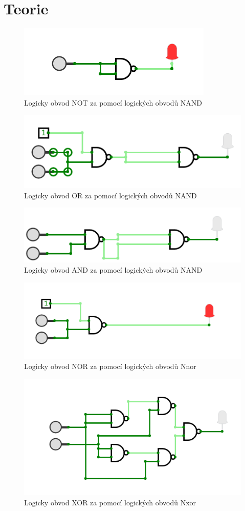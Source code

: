 \documentclass[a4paper]{article}
\begin{document}
\section*{Teorie}
\begin{figure}[h!]
	\renewcommand\figurename{Obvod}
	\centering
	\includegraphics[width=0.6\linewidth]{not.png}
	\caption{Logicky obvod  NOT za pomocí logických obvodů NAND}
	\label{fig:not}
\end{figure}
\begin{figure}[h!]
	\renewcommand\figurename{Obvod}
	\centering
	\includegraphics[width=0.6\linewidth]{or.png}
	\caption{Logicky obvod  OR za pomocí logických obvodů NAND}
	\label{fig:or}
\end{figure}
\begin{figure}[h!]
	\renewcommand\figurename{Obvod}
	\centering
	\includegraphics[width=0.6\linewidth]{and.png}
	\caption{Logicky obvod AND za pomocí logických obvodů NAND}
	\label{fig:and}
\end{figure}
\begin{figure}[h!]
	\renewcommand\figurename{Obvod}
	\centering
	\includegraphics[width=0.6\linewidth]{nor.png}
	\caption{Logicky obvod NOR za pomocí logických obvodů Nnor}
	\label{fig:nor}
\end{figure}
\begin{figure}[h!]
	\renewcommand\figurename{Obvod}
	\centering
	\includegraphics[width=0.6\linewidth]{xor.png}
	\caption{Logicky obvod XOR za pomocí logických obvodů Nxor}
	\label{fig:xor}
\end{figure}
\newpage
\end{document}
